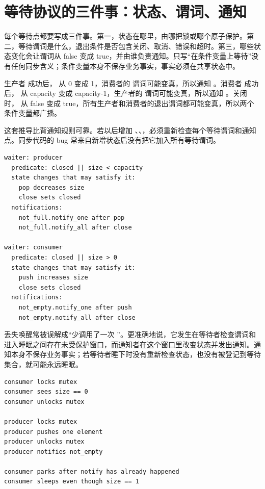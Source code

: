 \section{等待协议的三件事：状态、谓词、通知}

每个等待点都要写成三件事。第一，状态在哪里，由哪把锁或哪个原子保护。第二，等待谓词是什么，退出条件是否包含关闭、取消、错误和超时。第三，哪些状态变化会让谓词从 false 变成 true，并由谁负责通知。只写“在条件变量上等待”没有任何同步含义；条件变量本身不保存业务事实，事实必须在共享状态中。

生产者  成功后， 从 0 变成 1，消费者的  谓词可能变真，所以通知 。消费者  成功后， 从 capacity 变成 capacity-1，生产者的  谓词可能变真，所以通知 。关闭时， 从 false 变成 true，所有生产者和消费者的退出谓词都可能变真，所以两个条件变量都广播。

这套推导比背通知规则可靠。若以后增加 、、，必须重新检查每个等待谓词和通知点。同步代码的 bug 常来自新增状态后没有把它加入所有等待谓词。

\begin{lstlisting}[numbers=none,caption={等待点审查表}]
waiter: producer
  predicate: closed || size < capacity
  state changes that may satisfy it:
    pop decreases size
    close sets closed
  notifications:
    not_full.notify_one after pop
    not_full.notify_all after close

waiter: consumer
  predicate: closed || size > 0
  state changes that may satisfy it:
    push increases size
    close sets closed
  notifications:
    not_empty.notify_one after push
    not_empty.notify_all after close
\end{lstlisting}

丢失唤醒常被误解成“少调用了一次 ”。更准确地说，它发生在等待者检查谓词和进入睡眠之间存在未受保护窗口，而通知者在这个窗口里改变状态并发出通知。通知本身不保存业务事实；若等待者睡下时没有重新检查状态，也没有被登记到等待集合，就可能永远睡眠。

\begin{lstlisting}[numbers=none,caption={错误等待：检查和睡眠之间有窗口}]
consumer locks mutex
consumer sees size == 0
consumer unlocks mutex

producer locks mutex
producer pushes one element
producer unlocks mutex
producer notifies not_empty

consumer parks after notify has already happened
consumer sleeps even though size == 1
\end{lstlisting}

